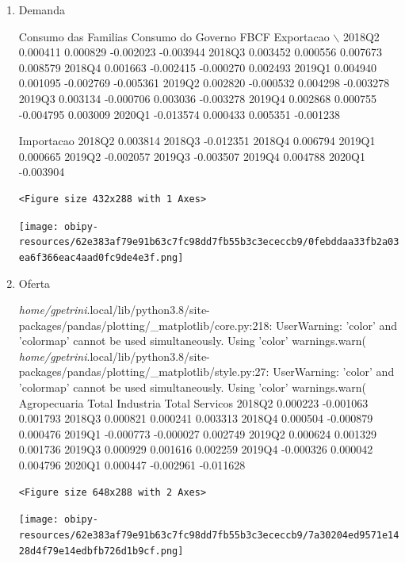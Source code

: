 \documentclass[11pt]{article}
\begin{document}
\begin{enumerate}
\item Demanda
\label{sec:org493814d}

        Consumo das Familias  Consumo do Governo      FBCF  Exportacao  $\backslash$
2018Q2              0.000411            0.000829 -0.002023   -0.003944   
2018Q3              0.003452            0.000556  0.007673    0.008579   
2018Q4              0.001663           -0.002415 -0.000270    0.002493   
2019Q1              0.004940            0.001095 -0.002769   -0.005361   
2019Q2              0.002820           -0.000532  0.004298   -0.003278   
2019Q3              0.003134           -0.000706  0.003036   -0.003278   
2019Q4              0.002868            0.000755 -0.004795    0.003009   
2020Q1             -0.013574            0.000433  0.005351   -0.001238   

        Importacao  
2018Q2    0.003814  
2018Q3   -0.012351  
2018Q4    0.006794  
2019Q1    0.000665  
2019Q2   -0.002057  
2019Q3   -0.003507  
2019Q4    0.004788  
2020Q1   -0.003904  

\begin{verbatim}
<Figure size 432x288 with 1 Axes>
\end{verbatim}


\begin{center}
\texttt{[image: obipy-resources/62e383af79e91b63c7fc98dd7fb55b3c3ececcb9/0febddaa33fb2a03ea6f366eac4aad0fc9de4e3f.png]}
\end{center}

\item Oferta
\label{sec:org0b0a149}

\emph{home/gpetrini}.local/lib/python3.8/site-packages/pandas/plotting/\_matplotlib/core.py:218: UserWarning: 'color' and 'colormap' cannot be used simultaneously. Using 'color'
  warnings.warn(
\emph{home/gpetrini}.local/lib/python3.8/site-packages/pandas/plotting/\_matplotlib/style.py:27: UserWarning: 'color' and 'colormap' cannot be used simultaneously. Using 'color'
  warnings.warn(
        Agropecuaria  Total Industria  Total Servicos
2018Q2      0.000223        -0.001063        0.001793
2018Q3      0.000821         0.000241        0.003313
2018Q4      0.000504        -0.000879        0.000476
2019Q1     -0.000773        -0.000027        0.002749
2019Q2      0.000624         0.001329        0.001736
2019Q3      0.000929         0.001616        0.002259
2019Q4     -0.000326         0.000042        0.004796
2020Q1      0.000447        -0.002961       -0.011628

\begin{verbatim}
<Figure size 648x288 with 2 Axes>
\end{verbatim}


\begin{center}
\texttt{[image: obipy-resources/62e383af79e91b63c7fc98dd7fb55b3c3ececcb9/7a30204ed9571e1428d4f79e14edbfb726d1b9cf.png]}
\end{center}
\end{enumerate}
\end{document}
